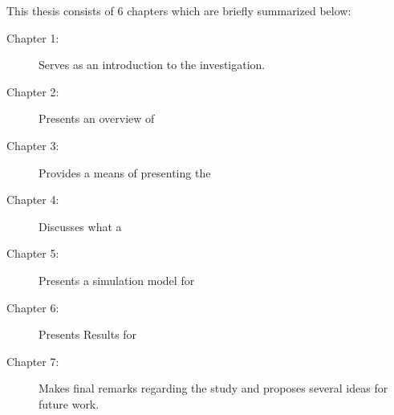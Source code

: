 \noindent
This thesis consists of 6 chapters which are briefly summarized below:
\begin{description}
\item [Chapter 1:] Serves as an introduction to the investigation.
\item [Chapter 2:] Presents an overview of \lipsum[1][5-7]
\item [Chapter 3:] Provides a means of presenting the \lipsum[1][5-7]
\item [Chapter 4:] Discusses what a \lipsum[1][5-7]
\item [Chapter 5:] Presents a simulation model for \lipsum[1][5-7]
\item [Chapter 6:] Presents Results for \lipsum[1][5-7]
\item [Chapter 7:] Makes final remarks regarding the study and proposes several ideas for future work.
\end{description}

